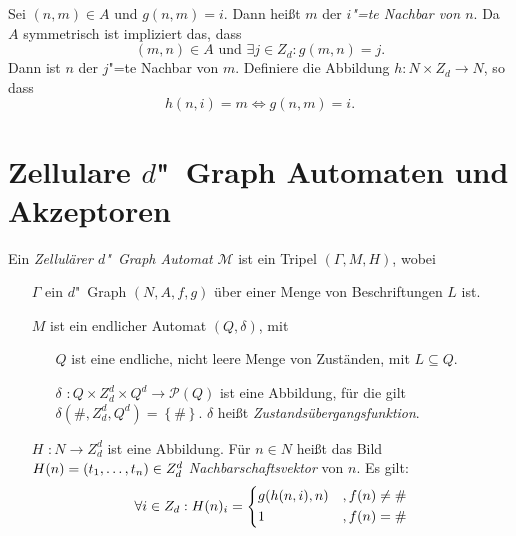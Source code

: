 \documentclass[11pt]{article}
\newcommand{\defWord}[1]{\emph{#1}}
\begin{document}
\begin{definition}[Nachbarschaft]
	Sei $\left(n, m\right) \in A$ und $g\left(n, m\right) = i$. 
	Dann heißt $m$ der \defWord{$i$"=te Nachbar von $n$}.
	Da $A$ symmetrisch ist impliziert das, dass 
	\begin{displaymath}
		\left(m, n\right) \in A \text{ und }\exists j \in Z_d : g(m, n) = j.
	\end{displaymath}
	Dann ist $n$ der $j$"=te Nachbar von $m$. 
	Definiere die Abbildung $h : N \times Z_d \rightarrow N$, so dass
	\begin{displaymath}
		 h(n, i) = m \iff g(n, m) = i.
	\end{displaymath}
\end{definition}

\section{Zellulare $d$"~Graph Automaten und Akzeptoren}

\begin{definition}
	Ein \defWord{Zellulärer $d$"~Graph Automat} $\mathcal{M}$ ist ein Tripel $\left(\Gamma, M, H\right)$, wobei
	\begin{itemize}
		\item[$\Gamma$] ein $d$"~Graph $\left(N, A, f, g\right)$ über einer Menge von Beschriftungen $L$ ist.
		\item[$M$]  ist ein endlicher Automat $\left(Q, \delta\right)$, mit 
		\begin{itemize}
			\item[$Q$] ist eine endliche, nicht leere Menge von Zuständen, mit $L \subseteq Q$.
			\item[$\delta$] $: Q \times Z_d^d \times Q^d \rightarrow \mathcal{P}\left(Q\right)$ ist eine Abbildung, für die gilt $\delta \left(\#, Z_d^d, Q^d\right) = \left \{\# \right \}$. $\delta$ heißt \defWord{Zustandsübergangsfunktion}.
		\end{itemize}
		\item[$H$] $: N \rightarrow Z_d^d$ ist eine Abbildung. 
		Für $n \in N$ heißt das Bild $H(n) = \left(t_1, \text{\dots}, t_n\right) \in Z_d^d$ \defWord{Nachbarschaftsvektor} von $n$. Es gilt: 
		\begin{displaymath}
			\forall i \in Z_d : H(n)_i = 
			\begin{dcases}
				g(h(n, i), n) & ,f(n) \neq \# \\
				1 & , f(n) = \# \\ %
			\end{dcases}
		\end{displaymath}
	\end{itemize}
\end{definition}
\end{document}
